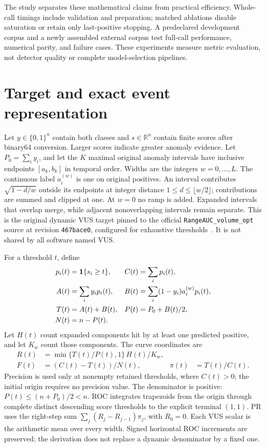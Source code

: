 The study separates these mathematical claims from practical efficiency.
Whole-call timings include validation and preparation; matched ablations
disable saturation or retain only last-positive stopping. A predeclared
development corpus and a newly assembled external corpus test full-call
performance, numerical parity, and failure cases. These experiments measure
metric evaluation, not detector quality or complete model-selection pipelines.

\section{Target and exact event representation}
Let $y\in\{0,1\}^n$ contain both classes and $s\in\mathbb{R}^n$ contain finite
scores after binary64 conversion. Larger scores indicate greater anomaly
evidence. Let $P_0=\sum_i y_i$, and let the $K$ maximal original anomaly
intervals have inclusive endpoints $[a_k,b_k]$ in temporal order. Widths are
the integers $w=0,\ldots,L$. The continuous label $a_i^{(w)}$ is one on
original positives. An interval contributes $\sqrt{1-d/w}$ outside its
endpoints at integer distance $1\le d\le\lfloor w/2\rfloor$; contributions
are summed and clipped at one. At $w=0$ no ramp is added. Expanded intervals
that overlap merge, while adjacent nonoverlapping intervals remain separate.
This is the original dynamic VUS target pinned to the official
\texttt{RangeAUC\_volume\_opt} source at revision
\texttt{467bace0}, configured for exhaustive thresholds~\cite{vusreference}.
It is not shared by all software named VUS.

For a threshold $t$, define
\begin{align}
 p_i(t)&=\mathbf{1}\{s_i\ge t\}, & C(t)&=\sum_i p_i(t),\\
 A(t)&=\sum_i y_i p_i(t), &
 B(t)&=\sum_i(1-y_i)a_i^{(w)}p_i(t),\\
 T(t)&=A(t)+B(t), & P(t)&=P_0+B(t)/2,\\
 N(t)&=n-P(t).
\end{align}
Let $H(t)$ count expanded components hit by at least one predicted positive,
and let $K_w$ count those components. The curve coordinates are
\begin{align}
 R(t)&=\min\{T(t)/P(t),1\}\,H(t)/K_w,\\
 F(t)&=(C(t)-T(t))/N(t), & \pi(t)&=T(t)/C(t).
\end{align}
Precision is used only at nonempty retained thresholds, where $C(t)>0$;
the initial origin requires no precision value.
The denominator is positive: $P(t)\le(n+P_0)/2<n$. ROC integrates trapezoids
from the origin through complete distinct descending score thresholds to
the explicit terminal $(1,1)$. PR uses the right-step sum
$\sum_j(R_j-R_{j-1})\pi_j$, with $R_0=0$. Each VUS scalar is the arithmetic
mean over every width. Signed horizontal ROC increments are preserved; the
derivation does not replace a dynamic denominator by a fixed one.

